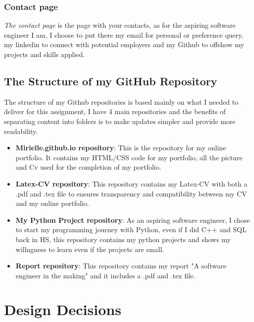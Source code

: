 \documentclass[12pt]{article}
\begin{document}
\subsubsection{Contact page}
\textit{The contact page} is the page with your contacts, as for the aspiring software engineer I am, I choose to put there my email for personal or preference query, my linkedin to connect with potential employers and my Github to offshow my projects and skills applied.

\subsection{The Structure of my GitHub Repository}

The structure of my Github repositories is based mainly on what I needed to deliver for this assignment, I have 4 main repositories and the benefits of separating content into folders is to make updates simpler and provide more readability.

\begin{itemize}

\item{\textbf{Mirielle.github.io repository}: This is the repository for my online portfolio. It contains my HTML/CSS code for my portfolio, all the picture and Cv used for the completion of my portfolio.}

\item{\textbf{Latex-CV repository}: This repository contains my Latex-CV with both a .pdf and .tex file to ensures transparency and compatibility between my CV and my online portfolio.}

\item{\textbf{My Python Project repository}: As an aspiring software engineer, I chose to start my programming journey with Python, even if I did C++ and SQL back in HS, this repository contains my python projects and shows my willngness to learn even if the projects are small.}

\item{\textbf{Report repository}: This repository contains my report "A software engineer in the making" and it includes a .pdf and .tex file. }

\end{itemize}

\newpage


\section{Design Decisions}
\end{document}
